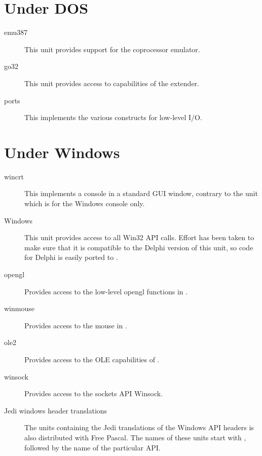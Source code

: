 %
%
\section{Under DOS}
\begin{description}
\item [emu387] This unit provides support for the coprocessor emulator.
\item [go32] This unit provides access to capabilities of the 
\dos extender.
\item[ports] This implements the various  constructs for low-level
I/O.
\end{description}

%
%
\section{Under Windows}
\begin{description}
\item[wincrt] This implements a console in a standard GUI window, contrary
to the  unit which is for the Windows console only.
\item[Windows] This unit provides access to all Win32 API calls. Effort has
been taken to make sure that it is compatible to the Delphi version of this
unit, so code for Delphi is easily ported to \fpc.
\item[opengl] Provides access to the low-level opengl functions in \windows.
\item[winmouse] Provides access to the mouse in \windows.
\item[ole2] Provides access to the OLE capabilities of \windows.
\item[winsock] Provides access to the \windows sockets API Winsock.
\item[Jedi windows header translations] The units containing the Jedi
translations of the Windows API headers is also distributed with Free
Pascal. The names of these units start with , followed by the 
name of the particular API.
\end{description}

%
%
